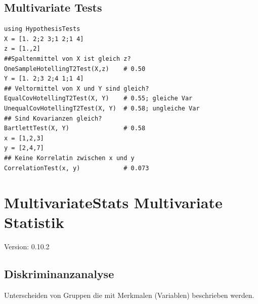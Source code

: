 \documentclass[10pt,twocolumn]{scrartcl}
\begin{document}
\subsection{Multivariate Tests}

\begin{lstlisting}
using HypothesisTests
X = [1. 2;2 3;1 2;1 4]
z = [1.,2]
##Spaltenmittel von X ist gleich z?
OneSampleHotellingT2Test(X,z)    # 0.50
Y = [1. 2;3 2;4 1;1 4]
## Veltormittel von X und Y sind gleich?
EqualCovHotellingT2Test(X, Y)    # 0.55; gleiche Var
UnequalCovHotellingT2Test(X, Y)  # 0.58; ungleiche Var
## Sind Kovarianzen gleich?
BartlettTest(X, Y)               # 0.58
x = [1,2,3]
y = [2,4,7]
## Keine Korrelatin zwischen x und y
CorrelationTest(x, y)            # 0.073
\end{lstlisting}

\section{MultivariateStats Multivariate Statistik}

Version: 0.10.2

\subsection{Diskriminanzanalyse}

Unterscheiden von Gruppen die mit Merkmalen (Variablen) beschrieben werden.
\end{document}
